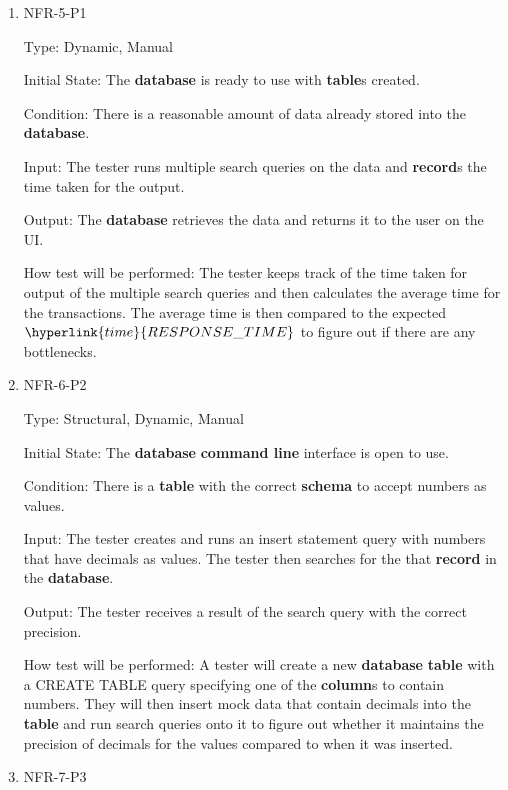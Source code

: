 \documentclass[12pt, titlepage]{article}
\begin{document}
\begin{enumerate}
    \item{NFR-5-P1\\}
    
    Type: Dynamic, Manual
    
    Initial State: The \textbf{database} is ready to use with \textbf{table}s created. 
    
    Condition: There is a reasonable amount of data already stored into the \textbf{database}. 
    
    Input: The tester runs multiple search queries on the data and \textbf{record}s the time taken for the output. 
    
    Output: The \textbf{database} retrieves the data and returns it to the user on the UI.
    
    How test will be performed: The tester keeps track of the time taken for output of the multiple search queries and then calculates the average time for the transactions. The average time is then compared to the expected $\hyperlink{time}{RESPONSE\_TIME}$ to figure out if there are any bottlenecks.  
    
    \item{NFR-6-P2\\}
    
    Type: Structural, Dynamic, Manual
    
    Initial State: The \textbf{database} \textbf{command line} interface is open to use. 
    
    Condition: There is a \textbf{table} with the correct \textbf{schema} to accept numbers as values. 
    
    Input: The tester creates and runs an insert statement query with numbers that have decimals as values. The tester then searches for the that \textbf{record} in the \textbf{database}. 
    
    Output: The tester receives a result of the search query with the correct precision. 
    
    How test will be performed: A tester will create a new \textbf{database} \textbf{table} with a CREATE TABLE query specifying one of the \textbf{column}s to contain numbers. They will then insert mock data that contain decimals into the \textbf{table} and run search queries onto it to figure out whether it maintains the precision of decimals for the values compared to when it was inserted.
    
    \item{NFR-7-P3\\}
    

\end{enumerate}
\end{document}
